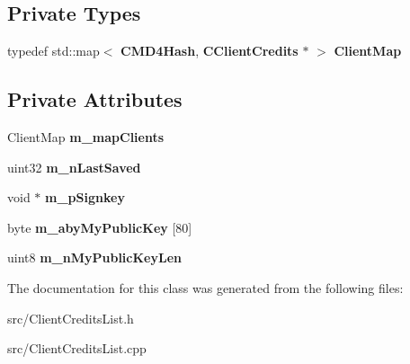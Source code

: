 \subsection*{Private Types}
\begin{DoxyCompactItemize}
\item 
typedef std::map$<$ {\bf CMD4Hash}, {\bf CClientCredits} $\ast$ $>$ {\bfseries ClientMap}\label{classCClientCreditsList_a35d571679caf1ec3cdfdb304613ccbb5}

\end{DoxyCompactItemize}
\subsection*{Private Attributes}
\begin{DoxyCompactItemize}
\item 
ClientMap {\bfseries m\_\-mapClients}\label{classCClientCreditsList_a4519fbb5551fff32cabacda3dc3c0f0a}

\item 
uint32 {\bfseries m\_\-nLastSaved}\label{classCClientCreditsList_a050934800dd95cece32fcbf9223ef59b}

\item 
void $\ast$ {\bfseries m\_\-pSignkey}\label{classCClientCreditsList_a0b449cb18274687d23acec46ac93f3b5}

\item 
byte {\bfseries m\_\-abyMyPublicKey} [80]\label{classCClientCreditsList_ab613e7242dc06797bcf2dd43df1ce7f5}

\item 
uint8 {\bfseries m\_\-nMyPublicKeyLen}\label{classCClientCreditsList_a28188b9065b81459fa819bac0839566a}

\end{DoxyCompactItemize}


The documentation for this class was generated from the following files:\begin{DoxyCompactItemize}
\item 
src/ClientCreditsList.h\item 
src/ClientCreditsList.cpp\end{DoxyCompactItemize}

